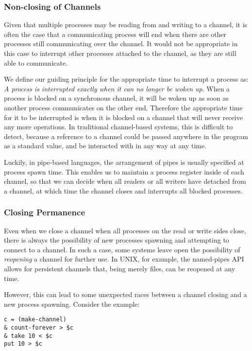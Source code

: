 \documentclass[english,PRO]{ipsj}
\begin{document}
\subsubsection{Non-closing of Channels}\label{non-closing}\noindent
Given that multiple processes may be reading from and writing to a channel, it is often the case that a communicating process will end when there are other processes still communicating over the channel. It would not be appropriate in this case to interrupt other processes attached to the channel, as they are still able to communicate.

We define our guiding principle for the appropriate time to interrupt a process as: \emph{A process is interrupted exactly when it can no longer be woken up}.
When a process is blocked on a synchronous channel, it will be woken up as soon as another process communicates on the other end.
Therefore the appropriate time for it to be interrupted is when it is blocked on a channel that will never receive any more operations.
In traditional channel-based systems, this is difficult to detect, because a reference to a channel could be passed anywhere in the program as a standard value, and be interacted with in any way at any time.

Luckily, in pipe-based languages, the arrangement of pipes is usually specified at process spawn time. This enables us to maintain a process register inside of each channel, so that we can decide when all readers or all writers have detached from a channel, at which time the channel closes and interrupts all blocked processes.

\subsubsection{Closing Permanence}\label{closing-permanence}\noindent
Even when we close a channel when all processes on the read or write sides close, there is always the possibility of new processes spawning and attempting to connect to a channel. In such a case, some systems leave open the possibility of \emph{reopening} a channel for further use. In UNIX, for example, the named-pipes API allows for persistent channels \cite{linux-pipe} that, being merely files, can be reopened at any time.

However, this can lead to some unexpected races between a channel closing and a new process spawning. Consider the example:
\begin{lstlisting}
c = (make-channel)
& count-forever > $c
& take 10 < $c
put 10 > $c
\end{lstlisting}
\end{document}
